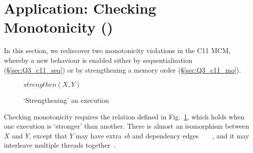 \section{Application: Checking Monotonicity ()}
\label{sec:monotonicity}

In this section, we rediscover two monotonicity violations in the C11
MCM, whereby a new behaviour is enabled either by sequentialisation
(\S\ref{sec:Q3_c11_seq}) or by strengthening a memory order
(\S\ref{sec:Q3_c11_mo}).

\begin{figure}
\centering
\begin{myFrame}{$strengthen(X,Y)$}
\end{myFrame}
\caption{`Strengthening' an execution}
\label{fig:strengthen}
\end{figure}

Checking monotonicity requires the relation defined in
Fig.~\ref{fig:strengthen}, which holds when one execution is
`stronger' than another. There is almost an isomorphism between $X$
and $Y$, except that $Y$ may have extra $sb$ and dependency
edges~~~~,
and it may interleave multiple threads together~.


